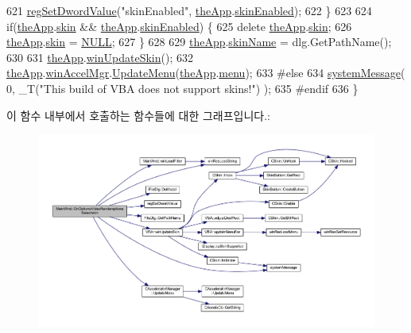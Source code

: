 \begin{DoxyCode}
621     \mbox{\hyperlink{_reg_8cpp_a758e775489a3fb5c3cc7071fdd5af87e}{regSetDwordValue}}(\textcolor{stringliteral}{"skinEnabled"}, \mbox{\hyperlink{_v_b_a_8cpp_a8095a9d06b37a7efe3723f3218ad8fb3}{theApp}}.\mbox{\hyperlink{class_v_b_a_a5cc7dbf58210b127d9e807e8a3262829}{skinEnabled}});
622   \}
623 
624   \textcolor{keywordflow}{if}(\mbox{\hyperlink{_v_b_a_8cpp_a8095a9d06b37a7efe3723f3218ad8fb3}{theApp}}.\mbox{\hyperlink{class_v_b_a_a2d80d3f19afa58047c05277aa0c18402}{skin}} && \mbox{\hyperlink{_v_b_a_8cpp_a8095a9d06b37a7efe3723f3218ad8fb3}{theApp}}.\mbox{\hyperlink{class_v_b_a_a5cc7dbf58210b127d9e807e8a3262829}{skinEnabled}}) \{
625     \textcolor{keyword}{delete} \mbox{\hyperlink{_v_b_a_8cpp_a8095a9d06b37a7efe3723f3218ad8fb3}{theApp}}.\mbox{\hyperlink{class_v_b_a_a2d80d3f19afa58047c05277aa0c18402}{skin}};
626     \mbox{\hyperlink{_v_b_a_8cpp_a8095a9d06b37a7efe3723f3218ad8fb3}{theApp}}.\mbox{\hyperlink{class_v_b_a_a2d80d3f19afa58047c05277aa0c18402}{skin}} = \mbox{\hyperlink{getopt1_8c_a070d2ce7b6bb7e5c05602aa8c308d0c4}{NULL}};
627   \}
628 
629   \mbox{\hyperlink{_v_b_a_8cpp_a8095a9d06b37a7efe3723f3218ad8fb3}{theApp}}.\mbox{\hyperlink{class_v_b_a_a61c4b5378e8a3a36cf65bf095cca7f47}{skinName}} = dlg.GetPathName();
630 
631   \mbox{\hyperlink{_v_b_a_8cpp_a8095a9d06b37a7efe3723f3218ad8fb3}{theApp}}.\mbox{\hyperlink{class_v_b_a_a4648998e25679df69b15afdccb428b8f}{winUpdateSkin}}();
632   \mbox{\hyperlink{_v_b_a_8cpp_a8095a9d06b37a7efe3723f3218ad8fb3}{theApp}}.\mbox{\hyperlink{class_v_b_a_ad7ebce057dbde0ca88cee75e84721a89}{winAccelMgr}}.\mbox{\hyperlink{class_c_accelerator_manager_ac7411d20f413ea0ec3bd65705b564adf}{UpdateMenu}}(\mbox{\hyperlink{_v_b_a_8cpp_a8095a9d06b37a7efe3723f3218ad8fb3}{theApp}}.\mbox{\hyperlink{class_v_b_a_acf9d855b5b959a2df9c6cb21b888366e}{menu}});
633 \textcolor{preprocessor}{#else}
634     \mbox{\hyperlink{system_8cpp_a747a9cb8e015a3d45cca636b5bd0fc69}{systemMessage}}( 0, \_T(\textcolor{stringliteral}{"This build of VBA does not support skins!"}) );
635 \textcolor{preprocessor}{#endif}
636 \}
\end{DoxyCode}
이 함수 내부에서 호출하는 함수들에 대한 그래프입니다.\+:
\nopagebreak
\begin{figure}[H]
\begin{center}
\leavevmode
\includegraphics[width=350pt]{class_main_wnd_a38b0a1dbd8af4407e43866565ffb9bad_cgraph}
\end{center}
\end{figure}
